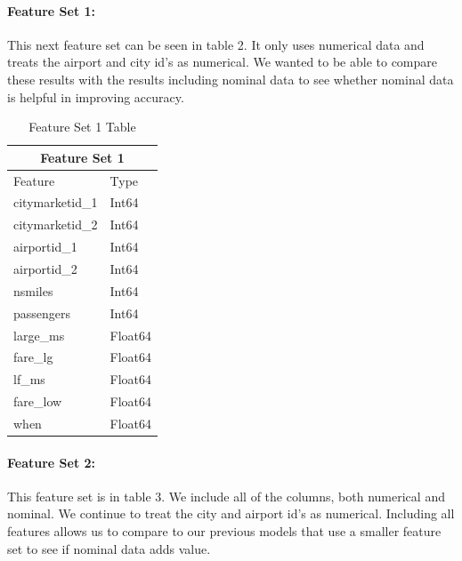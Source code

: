 \documentclass{article}
\begin{document}
\paragraph{Feature Set 1:}
This next feature set can be seen in table 2. It only uses numerical data and treats the airport and city id's as numerical. We wanted to be able to compare these results with the results including nominal data to see whether nominal data is helpful in improving accuracy.
\begin{table}[h!]
\centering
\begin{tabular}{ |p{3cm}||p{3cm}|  }
 \hline
 \multicolumn{2}{|c|}{Feature Set 1} \\
 \hline Feature & Type\\
 \hline
 citymarketid\_1 & Int64\\
 citymarketid\_2 & Int64\\
airportid\_1 & Int64\\
airportid\_2 & Int64\\
nsmiles & Int64\\
passengers & Int64 \\
large\_ms & Float64 \\
fare\_lg & Float64\\
lf\_ms & Float64\\
fare\_low & Float64\\
when & Float64\\
 \hline
\end{tabular}
\caption{Feature Set 1 Table}
\label{table:1}
\end{table}
\paragraph{Feature Set 2:} This feature set is in table 3. We include all of the columns, both numerical and nominal. We continue to treat the city and airport id's as numerical. Including all features allows us to compare to our previous models that use a smaller feature set to see if nominal data adds value. 
\end{document}

